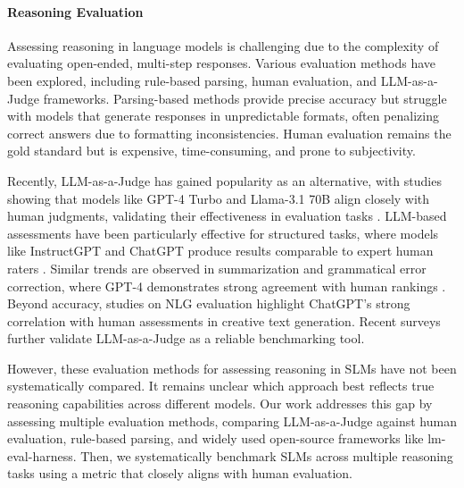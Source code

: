 \paragraph{Reasoning Evaluation} 
Assessing reasoning in language models is challenging due to the complexity of evaluating open-ended, multi-step responses. Various evaluation methods have been explored, including rule-based parsing, human evaluation, and LLM-as-a-Judge frameworks. Parsing-based methods provide precise accuracy but struggle with models that generate responses in unpredictable formats, often penalizing correct answers due to formatting inconsistencies. Human evaluation remains the gold standard but is expensive, time-consuming, and prone to subjectivity.

Recently, LLM-as-a-Judge has gained popularity as an alternative, with studies showing that models like GPT-4 Turbo and Llama-3.1 70B align closely with human judgments, validating their effectiveness in evaluation tasks \cite{thakur2024judging}. LLM-based assessments have been particularly effective for structured tasks, where models like InstructGPT and ChatGPT produce results comparable to expert human raters \cite{chiang2023can}. Similar trends are observed in summarization and grammatical error correction, where GPT-4 demonstrates strong agreement with human rankings \cite{sottana2023evaluation}. Beyond accuracy, studies on NLG evaluation \cite{wang2023chatgpt} highlight ChatGPT’s strong correlation with human assessments in creative text generation. Recent surveys \cite{gu2024survey, chang2024survey} further validate LLM-as-a-Judge as a reliable benchmarking tool.

However, these evaluation methods for assessing reasoning in SLMs have not been systematically compared. It remains unclear which approach best reflects true reasoning capabilities across different models. Our work addresses this gap by assessing multiple evaluation methods, comparing LLM-as-a-Judge against human evaluation, rule-based parsing, and widely used open-source frameworks like lm-eval-harness. Then, we systematically benchmark SLMs across multiple reasoning tasks using a metric that closely aligns with human evaluation. 

